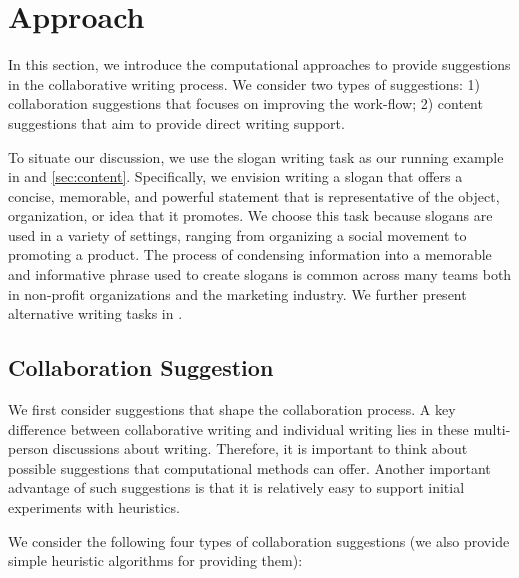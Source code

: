 
\section{Approach}


In this section, we introduce the computational approaches to provide suggestions in the collaborative writing process.
We consider two types of suggestions: 1) collaboration suggestions that focuses on improving the work-flow;
2) content suggestions that aim to provide direct writing support.

To situate our discussion, we use the slogan writing task as our running example in  and \ref{sec:content}.
Specifically, we envision writing a slogan that offers a concise, memorable,
and powerful statement that is representative of the object,
organization, or idea that it promotes.
We choose this task because slogans are used in a variety of settings, ranging
from organizing a social movement to promoting a product.
The process of condensing information into a memorable and
informative phrase used to create slogans is common across many teams both in non-profit organizations and the marketing industry.
We further present alternative writing tasks in .


\subsection{Collaboration Suggestion}
\label{sec:workflow}

We first consider suggestions that shape the collaboration process.
A key difference between collaborative writing and individual writing lies in these multi-person discussions about writing.
Therefore, it is important to think about possible suggestions that computational methods can offer.
Another important advantage of such suggestions is that it is relatively easy to support initial experiments with heuristics. 


We consider the following four types of collaboration suggestions (we also provide simple heuristic algorithms for providing them):

